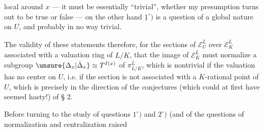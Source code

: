 local around $x$ --- it must be essentially ``trivial'', whether my presumption turns out to be true or false --- on the other hand $\underline{1}^\circ)$ is a question of a global nature on $U$, and probably in  no way trivial.

 The validity of these statements   therefore, for the sections of $\mathcal E_U^{\bar L}$ over $\mathcal E_K^{\bar L}$ associated with a valuation ring of $L/K$,  that the image of $\mathcal E_K^{\bar L}$ must normalize a  subgroup $\unsure{\Delta_x|\bar\Delta_x}\simeq T^{I(x)}$ of $\pi_{L/K}^{\bar L}$, which is nontrivial if the valuation has no center on $U$, i.e. if the section is not associated with a $K$-rational point of $U$, which is precisely in the direction of the conjectures (which could at first have seemed hasty!) of § $2$.

Before turning to the study of questions $1^\circ)$ and $2^\circ)$ (and  of the questions of normalization and centralization raised
